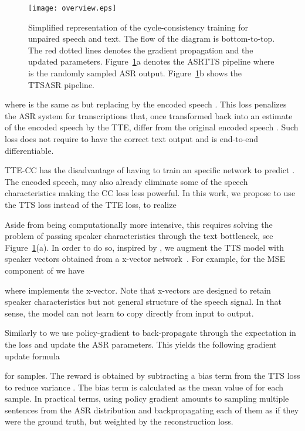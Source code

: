 \documentclass[a4paper]{article}
\begin{document}
\begin{figure}[H]
\begin{centering}
\texttt{[image: overview.eps]}
\caption{Simplified representation of the cycle-consistency training for unpaired speech and text. The flow of the diagram is bottom-to-top. The red dotted lines denotes the gradient propagation and the updated parameters. Figure~\ref{fig:overview}a denotes the ASRTTS pipeline where  is the  randomly sampled ASR output. Figure~\ref{fig:overview}b shows the TTSASR pipeline.}\label{fig:overview}
\end{centering}
\end{figure}



where  is the same as  but replacing  by the encoded speech . This loss penalizes the ASR system for transcriptions that, once transformed back into an estimate of the encoded speech  by the TTE, differ from the original encoded speech . Such loss does not require to have the correct text output  and is end-to-end differentiable.



TTE-CC has the disadvantage of having to train an specific network to predict . The encoded speech, may also already eliminate some of the speech characteristics making the CC loss less powerful. In this work, we propose to use the TTS loss instead of the TTE loss, to realize 

Aside from being computationally more intensive, this requires solving the problem of passing speaker characteristics through the text bottleneck, see Figure~\ref{fig:overview}(a). In order to do so, inspired by \cite{tjandra2017listening}, we augment the TTS model with speaker vectors obtained from a x-vector network~\cite{snyder2018x}. For example, for the MSE component of  we have

where  implements the x-vector. Note that x-vectors are designed to retain speaker characteristics but not general structure of the speech signal. In that sense, the model can not learn to copy directly  from input to output.

Similarly to \cite{hori2018cycle} we use policy-gradient to back-propagate through the expectation in the loss and update the ASR parameters. This yields the following gradient update formula

for  samples. The reward  is obtained by subtracting a bias term from the TTS loss to reduce variance . The bias term is calculated as the mean value of  for each sample. In practical terms, using policy gradient amounts to sampling multiple sentences from the ASR distribution and backpropagating each of them as if they were the ground truth, but weighted by the reconstruction loss. 
\end{document}
